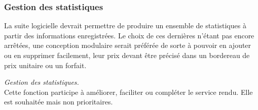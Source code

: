 \subsubsection{Gestion des statistiques}
La suite logicielle devrait permettre de produire un ensemble de statistiques à partir des informations enregistrées. Le choix de ces dernières n'étant pas encore arrêtées, une conception modulaire serait préférée de sorte à pouvoir en ajouter ou en supprimer facilement, leur prix devant être précisé dans un bordereau de prix unitaire ou un forfait.
\begin{notation}
\emph{Gestion des statistiques.}
\\
Cette fonction participe à améliorer, faciliter ou compléter le service rendu. Elle est souhaitée mais non prioritaires.
\end{notation}

